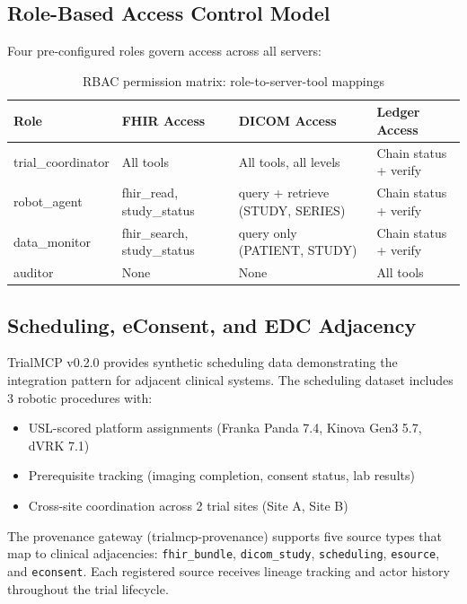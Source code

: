 \documentclass[10pt,letterpaper]{article}
\begin{document}
\subsection{Role-Based Access Control Model}

Four pre-configured roles govern access across all servers:

\begin{table}[H]
\centering
\caption{RBAC permission matrix: role-to-server-tool mappings}
\label{tab:rbac}
\small
\begin{tabularx}{\textwidth}{l X X X}
\toprule
\textbf{Role} & \textbf{FHIR Access} & \textbf{DICOM Access} & \textbf{Ledger Access} \\
\midrule
trial\_coordinator & All tools & All tools, all levels & Chain status + verify \\
robot\_agent & fhir\_read, study\_status & query + retrieve (STUDY, SERIES) & Chain status + verify \\
data\_monitor & fhir\_search, study\_status & query only (PATIENT, STUDY) & Chain status + verify \\
auditor & None & None & All tools \\
\bottomrule
\end{tabularx}
\end{table}

\subsection{Scheduling, eConsent, and EDC Adjacency}

TrialMCP v0.2.0 provides synthetic scheduling data demonstrating the integration pattern for adjacent clinical systems. The scheduling dataset includes 3 robotic procedures with:

\begin{itemize}[leftmargin=2em]
    \item USL-scored platform assignments (Franka Panda 7.4, Kinova Gen3 5.7, dVRK 7.1)
    \item Prerequisite tracking (imaging completion, consent status, lab results)
    \item Cross-site coordination across 2 trial sites (Site A, Site B)
\end{itemize}

The provenance gateway (trialmcp-provenance) supports five source types that map to clinical adjacencies: \texttt{fhir\_bundle}, \texttt{dicom\_study}, \texttt{scheduling}, \texttt{esource}, and \texttt{econsent}. Each registered source receives lineage tracking and actor history throughout the trial lifecycle.
\end{document}
